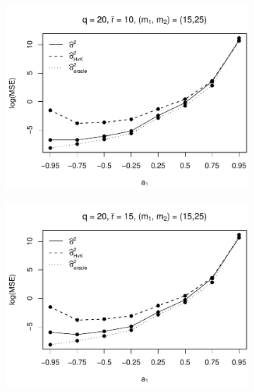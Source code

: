 \begin{figure}[p]
\begin{subfigure}[b]{0.45\textwidth}
\includegraphics[width=\textwidth]{Plots/Robustness/MSE_lrv_T=500_slope=10_(q,r,M1,M2)=(20,10,15,25).pdf}
\end{subfigure}
\hspace{0.25cm}
\begin{subfigure}[b]{0.45\textwidth}
\includegraphics[width=\textwidth]{Plots/Robustness/MSE_lrv_T=500_slope=10_(q,r,M1,M2)=(20,15,15,25).pdf}
\end{subfigure}


\end{figure}
